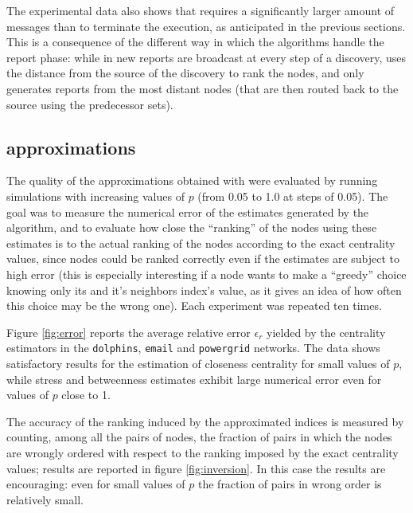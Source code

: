 The experimental data also shows that \deccen{} requires a significantly larger amount of messages than \multibfs{} to terminate the execution, as anticipated in the previous sections. This is a consequence of the different way in which the algorithms handle the report phase: while in \deccen{} new reports are broadcast at every step of a discovery, \multibfs{} uses the distance from the source of the discovery to rank the nodes, and only generates reports from the most distant nodes (that are then routed back to the source using the predecessor sets).

\subsection{\multibfs{} approximations}

The quality of the approximations obtained with \multibfs{} were evaluated by running simulations with increasing values of $p$ (from 0.05 to 1.0 at steps of 0.05). The goal was to measure the numerical error of the estimates generated by the algorithm, and to evaluate how close the ``ranking'' of the nodes using these estimates is to the actual ranking of the nodes according to the exact centrality values, since nodes could be ranked correctly even if the estimates are subject to high error (this is especially interesting if a node wants to make a ``greedy'' choice knowing only its and it's neighbors index's value, as it gives an idea of how often this choice may be the wrong one). Each experiment was repeated ten times.

Figure \ref{fig:error} reports the average relative error $\epsilon_r$ yielded by the centrality estimators in the \texttt{dolphins}, \texttt{email} and \texttt{powergrid} networks. The data shows satisfactory results for the estimation of closeness centrality for small values of $p$, while stress and betweenness estimates exhibit large numerical error even for values of $p$ close to 1.



The accuracy of the ranking induced by the approximated indices is measured by counting, among all the pairs of nodes, the fraction of pairs in which the nodes are wrongly ordered with respect to the ranking imposed by the exact centrality values; results are reported in figure \ref{fig:inversion}. In this case the results are encouraging: even for small values of $p$ the fraction of pairs in wrong order is relatively small.


